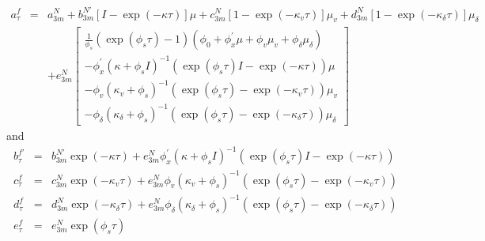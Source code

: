 \documentclass{article}
\begin{document}
\begin{eqnarray*}
a_{\tau }^{f} &=&a_{3m}^{N}+b_{3m}^{N\prime }\left[ I-\exp \left( -\kappa
\tau \right) \right] \mu +c_{3m}^{N}\left[ 1-\exp \left( -\kappa _{v}\tau
\right) \right] \mu _{v}+d_{3m}^{N}\left[ 1-\exp \left( -\kappa _{\delta
}\tau \right) \right] \mu _{\delta } \\
&&+e_{3m}^{N}\left[ 
\begin{array}{c}
\frac{1}{\phi _{s}}\left( \exp \left( \phi _{s}\tau \right) -1\right) \left(
\phi _{0}+\phi _{x}^{\prime }\mu +\phi _{v}\mu _{v}+\phi _{\delta }\mu
_{\delta }\right) \\ 
-\phi _{x}^{\prime }\left( \kappa +\phi _{s}I\right) ^{-1}\left( \exp \left(
\phi _{s}\tau \right) I-\exp \left( -\kappa \tau \right) \right) \mu \\ 
-\phi _{v}\left( \kappa _{v}+\phi _{s}\right) ^{-1}\left( \exp \left( \phi
_{s}\tau \right) -\exp \left( -\kappa _{v}\tau \right) \right) \mu _{v} \\ 
-\phi _{\delta }\left( \kappa _{\delta }+\phi _{s}\right) ^{-1}\left( \exp
\left( \phi _{s}\tau \right) -\exp \left( -\kappa _{\delta }\tau \right)
\right) \mu _{\delta }%
\end{array}%
\right]
\end{eqnarray*}%
and%
\begin{eqnarray*}
b_{\tau }^{f\prime } &=&b_{3m}^{N\prime }\exp \left( -\kappa \tau \right)
+e_{3m}^{N}\phi _{x}^{\prime }\left( \kappa +\phi _{s}I\right) ^{-1}\left(
\exp \left( \phi _{s}\tau \right) I-\exp \left( -\kappa \tau \right) \right)
\\
c_{\tau }^{f} &=&c_{3m}^{N}\exp \left( -\kappa _{v}\tau \right)
+e_{3m}^{N}\phi _{v}\left( \kappa _{v}+\phi _{s}\right) ^{-1}\left( \exp
\left( \phi _{s}\tau \right) -\exp \left( -\kappa _{v}\tau \right) \right) \\
d_{\tau }^{f} &=&d_{3m}^{N}\exp \left( -\kappa _{\delta }\tau \right)
+e_{3m}^{N}\phi _{\delta }\left( \kappa _{\delta }+\phi _{s}\right)
^{-1}\left( \exp \left( \phi _{s}\tau \right) -\exp \left( -\kappa _{\delta
}\tau \right) \right) \\
e_{\tau }^{f} &=&e_{3m}^{N}\exp \left( \phi _{s}\tau \right)
\end{eqnarray*}
\end{document}
